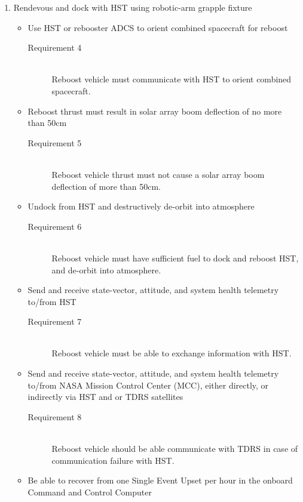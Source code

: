 \documentclass[onecolumn,10pt]{jhwhw}
\begin{document}
\begin{enumerate}
\begin{description}
\end{description}
\item Rendevous and dock with HST using robotic-arm grapple fixture
\begin{itemize}
\item Use HST or rebooster ADCS to orient combined spacecraft for reboost
\begin{description}
  \item[Requirement 4] \hfill \\
  Reboost vehicle must communicate with HST to orient combined spacecraft.
\end{description}
\item Reboost thrust must result in solar array boom deflection of no more than 50cm
\begin{description}
  \item[Requirement 5] \hfill \\
  Reboost vehicle thrust must not cause a solar array boom deflection of more than 50cm.
\end{description}
\item Undock from HST and destructively de-orbit into atmosphere
\begin{description}
  \item[Requirement 6] \hfill \\
  Reboost vehicle must have sufficient fuel to dock and reboost HST, and de-orbit into atmosphere.
\end{description}
\item Send and receive state-vector, attitude, and system health telemetry to/from HST
\begin{description}
  \item[Requirement 7] \hfill \\
  Reboost vehicle must be able to exchange information with HST.
\end{description}
\item Send and receive state-vector, attitude, and system health telemetry to/from NASA Mission Control Center (MCC), either directly, or indirectly via HST and or TDRS satellites
\begin{description}
  \item[Requirement 8] \hfill \\
  Reboost vehicle should be able communicate with TDRS in case of communication failure with HST.
\end{description}
\item Be able to recover from one Single Event Upset per hour in the onboard Command and Control Computer

\end{itemize}
\end{enumerate}
\end{document}
